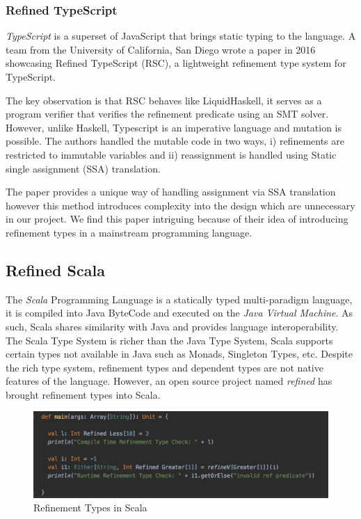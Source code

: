 \documentclass[a4paper,12pt]{report}
\begin{document}
\subsubsection{Refined TypeScript}
\textit{TypeScript} is a superset of JavaScript that brings static typing to the 
language. A team from the University of California, San Diego wrote a paper \cite{rts} 
in 2016 showcasing Refined TypeScript (RSC), a lightweight refinement type 
system for TypeScript. 

\par
The key observation is that RSC behaves like LiquidHaskell, it serves as a program 
verifier that verifies the refinement predicate using an SMT solver. However, 
unlike Haskell, Typescript is an imperative language and mutation is possible. 
The authors handled the mutable code in two ways, i) refinements are 
restricted to immutable variables and ii) reassignment is handled using 
Static single assignment (SSA) translation.

\par
The paper provides a unique way of handling assignment via SSA translation 
however this method introduces complexity into the design which are unnecessary 
in our project. We find this paper intriguing because of their idea of 
introducing refinement types in a mainstream programming language. 

\subsection{Refined Scala}
The \textit{Scala} \cite{scala} Programming Language is a statically 
typed multi-paradigm language, it is compiled into Java ByteCode and 
executed on the \textit{Java Virtual Machine}. 
As such, Scala shares similarity with Java and provides language 
interoperability. The Scala Type System is richer than the Java Type System, 
Scala supports certain types not available in Java such as Monads, 
Singleton Types, etc. Despite the rich type system, refinement types and dependent 
types are not native features of the language. However, an open source project 
named \textit{refined} \cite{refinedScala} has brought refinement types into Scala. 

\begin{figure}[H]
  \begin{center}
    \includegraphics[scale=0.7]{assets/refined_scala.PNG}
  \end{center}
  \caption{Refinement Types in Scala}
  \label{code:refined-scala}
\end{figure}
\end{document}

